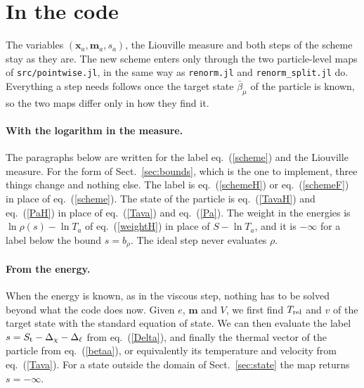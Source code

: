 \documentclass[11pt,aps,preprint,nofootinbib,superscriptaddress,tightenlines]{revtex4-2}
\def\Eq#1{eq.~(\ref{#1})}
\def\Sect#1{Sect.~\ref{#1}}
\let\oldparagraph\paragraph
\renewcommand{\paragraph}{\par\bigskip\oldparagraph}
\begin{document}
\section{In the code}
\label{sec:code}

The variables $(\bm x_a,\bm m_a,s_a)$, the Liouville measure and both steps of the scheme stay as they are.  The new scheme enters only through the
two particle-level maps of \nolinkurl{src/pointwise.jl}, in the same way as \nolinkurl{renorm.jl} and \nolinkurl{renorm_split.jl} do.  Everything
a step needs follows once the target state $\bar\beta_\mu$ of the particle is known, so the two maps differ only in how they find it.

\paragraph{With the logarithm in the measure.}  The paragraphs below are written for the label \Eq{scheme} and the Liouville measure.  For the form
of \Sect{sec:bounds}, which is the one to implement, three things change and nothing else.  The label is \Eq{schemeH} or \Eq{schemeF} in place of
\Eq{scheme}.  The state of the particle is \Eq{TavaH} and \Eq{PaH} in place of \Eq{Tava} and \Eq{Pa}.  The weight in the energies is
$\ln\rho(s)-\ln T_a$ of \Eq{weightH} in place of $S-\ln T_a$, and it is $-\infty$ for a label below the bound $s=b_\rho$.  The ideal step never
evaluates $\rho$.

\paragraph{From the energy.}  When the energy is known, as in the viscous step, nothing has to be solved beyond what the code does now.  Given $e$,
$\bm m$ and $V$, we first find $T_{\rm rel}$ and $v$ of the target state with the standard equation of state.  We can then evaluate the label
$s=S_{\rm t}-\Delta_\chi-\Delta_\ell$ from \Eq{Delta}, and finally the thermal vector of the particle from \Eq{betaa}, or equivalently its temperature and
velocity from \Eq{Tava}.  For a state outside the domain of \Sect{sec:state} the map returns $s=-\infty$.
\end{document}
